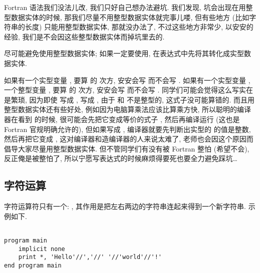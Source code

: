Fortran 语法我们没法儿改, 我们只好自己想办法避坑. 我们发现, 坑会出现在用整型数据实体的时候, 那我们尽量不用整型数据实体就完事儿喽, 但有些地方 (比如字符串的长度) 只能用整型数据实体, 那就没办法了, 不过这些地方非常少, 以安安的经验, 我们是不会因这些整型数据实体而掉坑里去的.
\begin{convention}
    尽可能避免使用整型数据实体; 如果一定要使用, 在表达式中先将其转化成实型数据实体.
\end{convention}
如果有一个实型变量 , 要算  的  次方, 安安会写  而不会写 . 如果有一个实型变量 , 一个整型变量 , 要算  的  次方, 安安会写  而不会写 . 同学们可能会觉得这么写实在是繁琐, 因为即使  写成 ,  写成 , 由于  和  不是整型的, 这式子没可能算错的. 而且用整型数据实体还有些好处, 例如因为电脑算乘法应该比算乘方快, 所以聪明的编译器在看到  的时候, 很可能会先把它变成等价的式子 , 然后再编译运行 (这也是 Fortran 官规明确允许的), 但如果写成 , 编译器就要先判断出实型的  的值是整数, 然后再把它变成 , 这对编译器和造编译器的人来说太难了, 老师也会因这个原因而倡导大家尽量用整型数据实体. 但不管同学们有没有被 Fortran 整怕 (希望不会), 反正俺是被整怕了, 所以宁愿写表达式的时候麻烦得要死也要全力避免踩坑\dots{}

\subsection{字符运算}\label{fortran_char_operator}

字符运算符只有一个: \ttt{//}, 其作用是把左右两边的字符串连起来得到一个新字符串. 示例如下.
\begin{lstlisting}

program main
    implicit none
    print *, 'Hello'//','//' '//'world'//'!'
end program main
\end{lstlisting}

